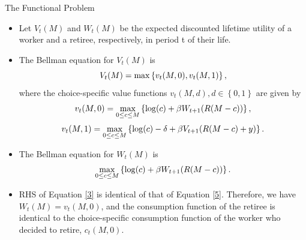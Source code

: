 \documentclass[aspectratio=169]{beamer}
\begin{document}
\begin{frame}{The Functional Problem}

	\begin{itemize}
		\item Let $V_t(M)$ and $W_t(M)$ be the expected discounted lifetime utility of a worker and a retiree, respectively, in period t of their life.
		\item The Bellman equation for $V_t(M)$ is 
		\begin{equation}\small
			\label{2}
			V_t(M)=\max \left\{v_t(M, 0), v_t(M, 1)\right\},
		\end{equation}
		where the choice-specific value functions $v_t(M, d), d \in \left\{ 0, 1\right\}$ are given by 
		\begin{equation}\small
			\label{3}
			 v_t(M, 0)=\max _{0 \leq c \leq M}\left\{\log (c)+\beta W_{t+1}(R(M-c))\right\},
		\end{equation}
		\begin{equation}\small
			\label{4}
			v_t(M, 1)=\max _{0 \leq c \leq M}\left\{\log (c)-\delta+\beta V_{t+1}(R(M-c)+y)\right\} .
		\end{equation}
		\item The Bellman equation for $W_t(M)$ is 
		\begin{equation}\small
			\label{5}
			\max _{0 \leq c \leq M}\left\{\log (c)+\beta W_{t+1}(R(M-c))\right\}.
		\end{equation}
		\item RHS of Equation \ref{3} is identical of that of Equation \ref{5}. Therefore, we have $W_t(M) = v_t(M, 0)$, and the consumption function of the retiree is identical to the choice-specific consumption function of the worker who decided to retire, $c_t(M, 0)$.
	\end{itemize}

\end{frame}
\end{document}
